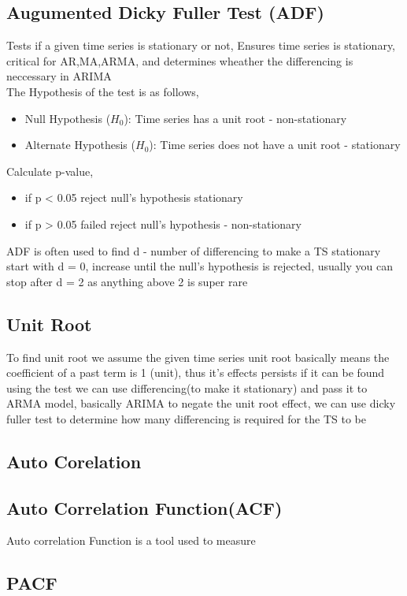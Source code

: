 \documentclass[12pt]{extarticle}
\begin{document}
\subsection{Augumented Dicky Fuller Test (ADF)}
Tests if a given time series is stationary or not, Ensures time series
is stationary, critical for AR,MA,ARMA, and determines wheather the 
differencing is neccessary in ARIMA \\
The Hypothesis of the test is as follows,
\begin{itemize}
    \item Null Hypothesis ($H_0$): Time series has a unit root - non-stationary
    \item Alternate Hypothesis ($H_0$): Time series does not have a unit root - stationary
\end{itemize}
Calculate p-value, 
\begin{itemize}
    \item if p < 0.05 reject null's hypothesis stationary
    \item if p > 0.05 failed reject null's hypothesis - non-stationary
\end{itemize}
ADF is often used to find d - number of differencing to make a TS stationary start with d = 0,
increase until the null's hypothesis is rejected, usually you can stop after d = 2 as anything
above 2 is super rare

\subsection{Unit Root}
To find unit root we assume the given time series 
unit root basically means the coefficient of a past term is 1 (unit), thus it’s effects 
persists if it can be found using the test we can use differencing(to make it stationary)
and pass it to ARMA model, basically ARIMA to negate the unit root effect,  we can use dicky 
fuller test to determine how many differencing is required for the TS to be 

\subsection*{Auto Corelation}
\subsection{Auto Correlation Function(ACF)}
Auto correlation Function is a tool used to measure


\subsection{PACF}
\end{document}
